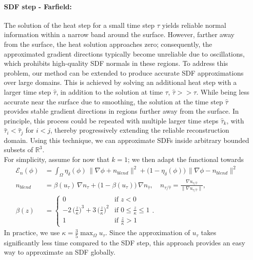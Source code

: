 \documentclass[12pt,openany]{book}
\newcommand{\R}{\mathbb{R}}
\theoremstyle{plainnormal}
\theoremstyle{remark}
\begin{document}
\paragraph{SDF step - Farfield:}
The solution of the heat step for a small time step $\tau$ yields reliable normal information within a narrow band around the surface. However, farther away from the surface, the heat solution approaches zero; consequently, the approximated gradient directions typically become unreliable due to oscillations, which prohibits high-quality SDF normals in these regions. To address this problem, our method can be extended to produce accurate SDF approximations over large domains. This is achieved by solving an additional heat step with a larger time step $\hat{\tau}$, in addition to the solution at time $\tau$, $\hat \tau >> \tau$. While being less accurate near the surface due to smoothing, the solution at the time step $\hat \tau$ provides stable gradient directions in regions further away from the surface. In principle, this process could be repeated with multiple larger time steps $\hat{\tau}_k$, with $\hat{\tau}_i < \hat{\tau}_j$ for $i < j$, thereby progressively extending the reliable reconstruction domain. Using this technique, we can approximate SDFs inside arbitrary bounded subsets of $\R^3$.\\
For simplicity, assume for now that $k = 1$; we then adapt the functional towards 
\begin{align*}
    \mathcal{E}_n (\phi)&= \int_\Omega \eta_\delta(\phi)\, \|\nabla \phi + n_{blend}\|^2 + \big(1 - \eta_\delta(\phi)\big)\,\|\nabla \phi - n_{blend}\|^2 \\  n_{blend} &= \beta(u_\tau)\, \nabla n_\tau + \big(1-\beta(u_\tau)\big)\,\nabla n_{\hat \tau}, \quad n_{\tau/ \hat \tau} = \frac{\nabla u_{\tau/ \hat \tau}}{\|\nabla u_{\tau/ \hat \tau}\|}, \\\beta(z) &= \begin{cases}
0 & \text{if } z < 0 \\
-2\,\big(\frac{z}{\kappa}\big)^3 + 3\, \big(\frac{z}{\kappa}\big)^2 & \text{if } 0 \leq \frac{z}{\kappa} \leq 1 \\
1 & \text{if } \frac{z}{\kappa} > 1
\end{cases}.
\end{align*} 
In practice, we use $\kappa = \frac{3}{5} \max_\Omega u_\tau $. Since the approximation of $u_\tau$ takes significantly less time compared to the SDF step, this approach provides an easy way to approximate an SDF globally.\\
\end{document}
